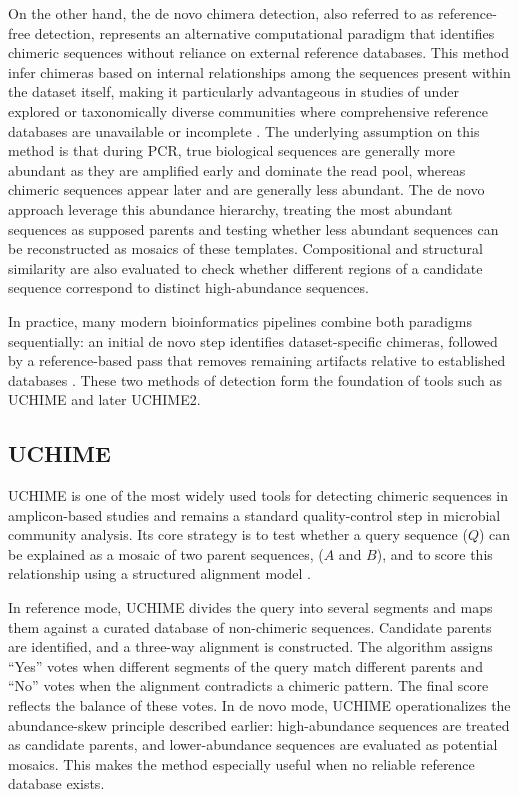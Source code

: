 On the other hand, the de novo chimera detection, also referred to as reference-free detection, represents an alternative computational paradigm that identifies chimeric sequences without reliance on external reference databases. This method infer chimeras based on internal relationships among the sequences present within the dataset itself, making it particularly advantageous in studies of under explored or taxonomically diverse communities where comprehensive reference databases are unavailable or incomplete \citep{Edgar2011,Edgar2016}. The underlying assumption on this method is that during PCR, true biological sequences are generally more abundant as they are amplified early and dominate the read pool, whereas chimeric sequences appear later and are generally less abundant. The de novo approach leverage this abundance hierarchy, treating the most abundant sequences as supposed parents and testing whether less abundant sequences can be reconstructed as mosaics of these templates. Compositional and structural similarity are also evaluated to check whether different regions of a candidate sequence correspond to distinct high-abundance sequences.

In practice, many modern bioinformatics pipelines combine both paradigms sequentially: an initial de novo step identifies dataset-specific chimeras, followed by a reference-based pass that removes remaining artifacts relative to established databases \citep{Edgar2016}. These two methods of detection form the foundation of tools such as UCHIME and later UCHIME2.

\subsection{UCHIME}
UCHIME is one of the most widely used tools for detecting chimeric sequences in amplicon-based studies and remains a standard quality-control step in microbial community analysis. Its core strategy is to test whether a query sequence ($Q$) can be explained as a mosaic of two parent sequences, ($A$ and $B$), and to score this relationship using a structured alignment model \citep{Edgar2011}.

In reference mode, UCHIME divides the query into several segments and maps them against a curated database of non-chimeric sequences. Candidate parents are identified, and a three-way alignment is constructed. The algorithm assigns “Yes” votes when different segments of the query match different parents and “No” votes when the alignment contradicts a chimeric pattern. The final score reflects the balance of these votes. In de novo mode, UCHIME operationalizes the abundance-skew principle described earlier: high-abundance sequences are treated as candidate parents, and lower-abundance sequences are evaluated as potential mosaics. This makes the method especially useful when no reliable reference database exists.

